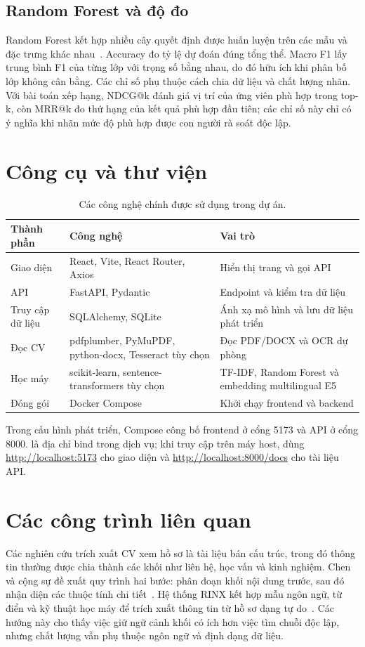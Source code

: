 \subsection{Random Forest và độ đo}
Random Forest kết hợp nhiều cây quyết định được huấn luyện trên các mẫu và đặc trưng khác nhau~\cite{Breiman2001}. Accuracy đo tỷ lệ dự đoán đúng tổng thể. Macro F1 lấy trung bình F1 của từng lớp với trọng số bằng nhau, do đó hữu ích khi phân bố lớp không cân bằng. Các chỉ số phụ thuộc cách chia dữ liệu và chất lượng nhãn. Với bài toán xếp hạng, NDCG@k đánh giá vị trí của ứng viên phù hợp trong top-k, còn MRR@k đo thứ hạng của kết quả phù hợp đầu tiên; các chỉ số này chỉ có ý nghĩa khi nhãn mức độ phù hợp được con người rà soát độc lập.

\section{Công cụ và thư viện}
\begin{table}[H]
\centering
\caption{Các công nghệ chính được sử dụng trong dự án.}
\label{tab:congcu}
\begin{tabular}{p{}p{}p{}}
\toprule
\textbf{Thành phần} & \textbf{Công nghệ} & \textbf{Vai trò} \\
\midrule
Giao diện & React, Vite, React Router, Axios & Hiển thị trang và gọi API \\
API & FastAPI, Pydantic & Endpoint và kiểm tra dữ liệu \\
Truy cập dữ liệu & SQLAlchemy, SQLite & Ánh xạ mô hình và lưu dữ liệu phát triển \\
Đọc CV & pdfplumber, PyMuPDF, python-docx, Tesseract tùy chọn & Đọc PDF/DOCX và OCR dự phòng \\
Học máy & scikit-learn, sentence-transformers tùy chọn & TF-IDF, Random Forest và embedding multilingual E5 \\
Đóng gói & Docker Compose & Khởi chạy frontend và backend \\
\bottomrule
\end{tabular}
\end{table}

Trong cấu hình phát triển, Compose công bố frontend ở cổng 5173 và API ở cổng 8000.  là địa chỉ bind trong dịch vụ; khi truy cập trên máy host, dùng \url{http://localhost:5173} cho giao diện và \url{http://localhost:8000/docs} cho tài liệu API.

\section{Các công trình liên quan}
Các nghiên cứu trích xuất CV xem hồ sơ là tài liệu bán cấu trúc, trong đó thông tin thường được chia thành các khối như liên hệ, học vấn và kinh nghiệm. Chen và cộng sự đề xuất quy trình hai bước: phân đoạn khối nội dung trước, sau đó nhận diện các thuộc tính chi tiết~\cite{Chen2018}. Hệ thống RINX kết hợp mẫu ngôn ngữ, từ điển và kỹ thuật học máy để trích xuất thông tin từ hồ sơ dạng tự do~\cite{Palshikar2023}. Các hướng này cho thấy việc giữ ngữ cảnh khối có ích hơn việc tìm chuỗi độc lập, nhưng chất lượng vẫn phụ thuộc ngôn ngữ và định dạng dữ liệu.

